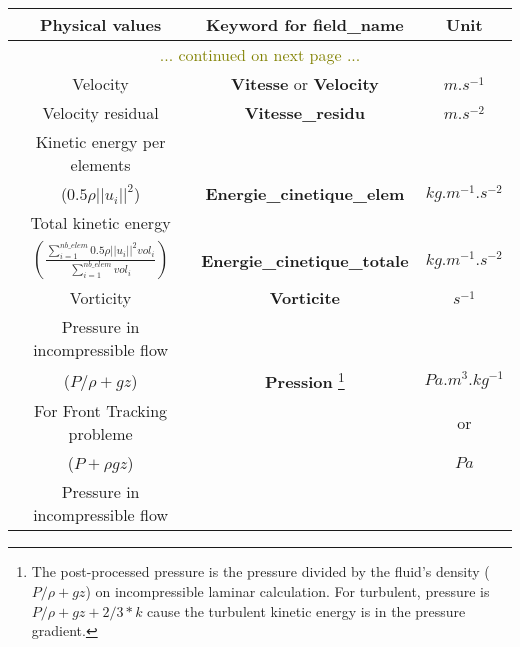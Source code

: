 \begin{longtable}[hcr]{|c|c|c|}
\hline \textbf{Physical values}                        & \textbf{Keyword for field\_name}          & \textbf{Unit} \\ \hline \endhead
\hline\multicolumn{3}{|c|}{\textcolor{olive}{... continued on next page ...}}  \\ \hline \endfoot
\hline \hline \endlastfoot


Velocity                                        & \textbf{Vitesse} or \textbf{Velocity}     & $m.s^{-1}$ \\ \hline
Velocity residual                               & \textbf{Vitesse\_residu}                  & $m.s^{-2}$ \\ \hline
Kinetic energy per elements                     &                                           & \\
($0.5 \rho ||u_i||^2$)                          & \textbf{Energie\_cinetique\_elem}         & $kg.m^{-1}.s^{-2}$ \\ \hline
Total kinetic energy                            &                                           & \\
$\displaystyle \left( \frac{\sum_{i=1}^{nb\_elem} 0.5 \rho ||u_i||^2 vol_i}{\sum_{i=1}^{nb\_elem} vol_i} \right)$                            & \textbf{Energie\_cinetique\_totale}       & $kg.m^{-1}.s^{-2}$ \\ \hline
Vorticity                                       & \textbf{Vorticite}                        & $s^{-1}$ \\ \hline
Pressure in incompressible flow                 &                                           & \\
($P/\rho+gz$)                                   & \textbf{Pression} \footnote{The post-processed pressure is the pressure divided by the fluid's density ($P/\rho+gz$) on incompressible laminar calculation. For turbulent, pressure is $P/\rho+gz+2/3*k$ cause the turbulent kinetic energy is in the pressure gradient.}
                                                                                            & $Pa.m^3.kg^{-1}$ \\
For Front Tracking probleme                     &                                           & or \\
($P+\rho gz$)                                   &                                           &  $Pa$ \\ \hline
Pressure in incompressible flow                 &                                           &   \\

\end{longtable}
